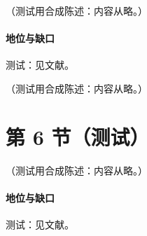 \begin{proposition}\label{prop:excl-meson-T}
（测试用合成陈述：内容从略。）
\end{proposition}
\paragraph{地位与缺口}测试：见文献。

\begin{remark}[宽角强子散射]\label{rem:excl-hadron-scattering}
（测试用合成陈述：内容从略。）
\end{remark}

\section{第 6 节（测试）}\label{sec:excl-dvcs}

\begin{proposition}\label{prop:excl-near-threshold}
（测试用合成陈述：内容从略。）
\end{proposition}
\paragraph{地位与缺口}测试：见文献。
